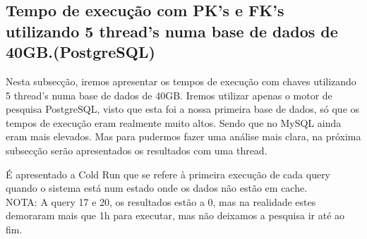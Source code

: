 \documentclass{article}
\begin{document}
  \clearpage



  \subsection{Tempo de execução com PK's e FK's utilizando 5 thread's numa base de dados de 40GB.(PostgreSQL)}
\texttt{}\par Nesta subsecção, iremos apresentar os tempos de execução com chaves utilizando 5 thread's numa base de dados de 40GB. Iremos utilizar apenas o motor de pesquisa PostgreSQL, visto que esta foi a nossa primeira base de dados, só que os tempos de execução eram realmente muito altos. Sendo que no MySQL ainda eram mais elevados. Mas para pudermos fazer uma análise mais clara, na próxima subsecção serão apresentados os resultados com uma thread.\\
\texttt{}\par É apresentado a Cold Run que se refere à primeira execução de cada query quando o sistema está num estado onde os dados não estão em cache.\\
NOTA: A query 17 e 20, os resultados estão a 0, mas na realidade estes demoraram mais que 1h para executar, mas não deixamos a pesquisa ir até ao fim.
\end{document}
